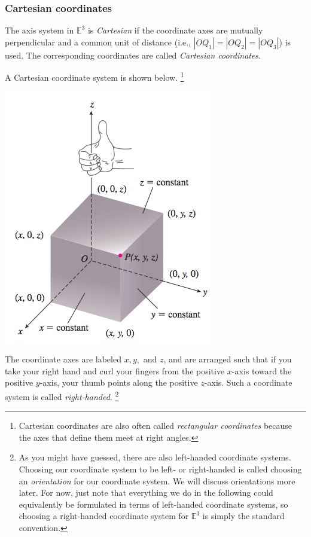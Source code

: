 \documentclass[12pt,letterpaper,reqno]{article}
\numberwithin{equation}{section}
\newcommand{\ti}[1]{\textit{#1}}
\begin{document}
\subsubsection{Cartesian coordinates}
\begin{defn}
	The axis system in $\mathbb{E}^3$ is \ti{Cartesian} if the coordinate axes are mutually perpendicular and a common unit of distance (i.e., $|OQ_1|=|OQ_2|=|OQ_3|$) is used. The corresponding coordinates are called \ti{Cartesian coordinates}.
\end{defn}
A Cartesian coordinate system is shown below. \footnote{Cartesian coordinates are also often called \ti{rectangular coordinates} because the axes that define them meet at right angles.}
\begin{center}
	\includegraphics[scale=0.5]{figures_mvc/cartesian_coordinate_system}
\end{center}
The coordinate axes are labeled $x,y,$ and $z$, and are arranged such that if you take your right hand and curl your fingers from the positive $x$-axis toward the positive $y$-axis, your thumb points along the positive $z$-axis. Such a coordinate system is called \ti{right-handed}. \footnote{As you might have guessed, there are also left-handed coordinate systems. Choosing our coordinate system to be left- or right-handed is called choosing an \ti{orientation} for our coordinate system. We will discuss orientations more later. For now, just note that everything we do in the following could equivalently be formulated in terms of left-handed coordinate systems, so choosing a right-handed coordinate system for $\mathbb{E}^3$ is simply the standard convention.}
\end{document}
